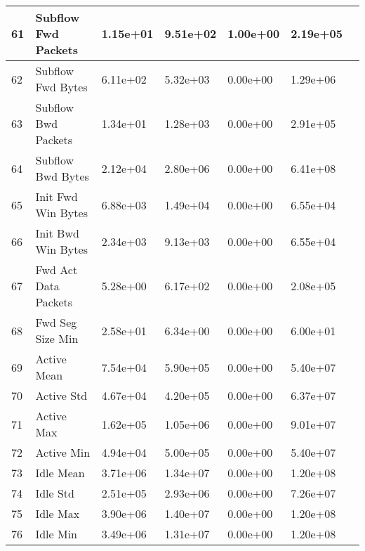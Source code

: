 \begin{center}
\begin{longtable}{|l|l|l|l|l|l|l|}
        \hline
        61 & Subflow Fwd Packets & 1.15e+01 & 9.51e+02 & 1.00e+00 & 2.19e+05 \\
        \hline
        62 & Subflow Fwd Bytes & 6.11e+02 & 5.32e+03 & 0.00e+00 & 1.29e+06 \\
        \hline
        63 & Subflow Bwd Packets & 1.34e+01 & 1.28e+03 & 0.00e+00 & 2.91e+05 \\
        \hline
        64 & Subflow Bwd Bytes & 2.12e+04 & 2.80e+06 & 0.00e+00 & 6.41e+08 \\
        \hline
        65 & Init Fwd Win Bytes & 6.88e+03 & 1.49e+04 & 0.00e+00 & 6.55e+04 \\
        \hline
        66 & Init Bwd Win Bytes & 2.34e+03 & 9.13e+03 & 0.00e+00 & 6.55e+04 \\
        \hline
        67 & Fwd Act Data Packets & 5.28e+00 & 6.17e+02 & 0.00e+00 & 2.08e+05 \\
        \hline
        68 & Fwd Seg Size Min & 2.58e+01 & 6.34e+00 & 0.00e+00 & 6.00e+01 \\
        \hline
        69 & Active Mean & 7.54e+04 & 5.90e+05 & 0.00e+00 & 5.40e+07 \\
        \hline
        70 & Active Std & 4.67e+04 & 4.20e+05 & 0.00e+00 & 6.37e+07 \\
        \hline
        71 & Active Max & 1.62e+05 & 1.05e+06 & 0.00e+00 & 9.01e+07 \\
        \hline
        72 & Active Min & 4.94e+04 & 5.00e+05 & 0.00e+00 & 5.40e+07 \\
        \hline
        73 & Idle Mean & 3.71e+06 & 1.34e+07 & 0.00e+00 & 1.20e+08 \\
        \hline
        74 & Idle Std & 2.51e+05 & 2.93e+06 & 0.00e+00 & 7.26e+07 \\
        \hline
        75 & Idle Max & 3.90e+06 & 1.40e+07 & 0.00e+00 & 1.20e+08 \\
        \hline
        76 & Idle Min & 3.49e+06 & 1.31e+07 & 0.00e+00 & 1.20e+08 \\
        \hline
    \end{longtable}
\end{center}

